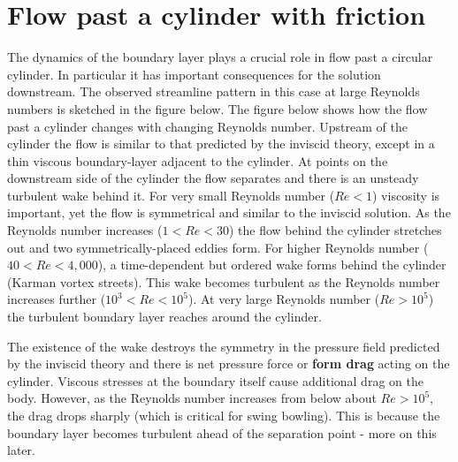 \documentclass[10pt]{report}
\begin{document}
\section{Flow past a cylinder with friction}
The dynamics of the boundary layer plays a crucial role in flow past a
circular cylinder. In particular it has important consequences for the solution downstream.
The observed streamline pattern in this case at large Reynolds numbers is
sketched in the figure below. The figure below shows how the flow past a
cylinder changes with changing Reynolds number. Upstream of the cylinder the
flow is similar to that predicted by the inviscid theory, except in a thin
viscous boundary-layer adjacent to the cylinder. At points on the downstream
side of the cylinder the flow separates and there is an unsteady turbulent
wake behind it. For very small Reynolds number ($Re < 1$) viscosity is
important, yet the flow is symmetrical and similar to the inviscid solution.
As the Reynolds number increases ($1< Re < 30$) the flow behind the
cylinder stretches out and two symmetrically-placed eddies form. For higher
Reynolds number ($40 < Re < 4,000$), a time-dependent but ordered wake
forms behind the cylinder (Karman vortex streets). This wake becomes
turbulent as the Reynolds number increases further ($10^{3} < Re < 10^{5}$). At very large Reynolds number ($Re > 10^{5}$) the turbulent
boundary layer reaches around the cylinder.

The existence of the wake destroys the symmetry in the pressure field
predicted by the inviscid theory and there is net pressure force or
\textbf{form drag} acting on the cylinder. Viscous stresses at the boundary
itself cause additional drag on the body. However, as the Reynolds number
increases from below about $Re > 10^{5}$, the drag drops sharply (which is
critical for swing bowling). This is because the boundary layer becomes
turbulent ahead of the separation point - more on this later.
\end{document}
